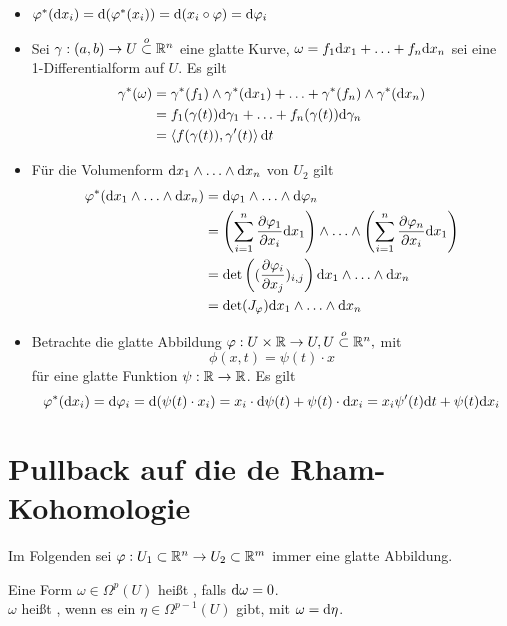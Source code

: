 \Bsp{}
\begin{itemize}
	\item $\varphi^*(\text{d} x_i) = \text{d}(\varphi^*(x_i)) = \text{d} (x_i \circ \varphi ) = \text{d} \varphi_i$
	\item Sei $\gamma : (a,b) \overset{}{\rightarrow} U \overset{o}{\subset} \mathbb{R}^n$ eine glatte Kurve, $\omega = f_1\text{d} x_1 + \ldots +f_n \text{d} x_n$ sei eine 1-Differentialform auf $U$. Es gilt
	\begin{align*}
	\gamma^*(\omega) &= \gamma^*(f_1) \wedge \gamma^*(\text{d} x_1) + \ldots + \gamma^*(f_n) \wedge \gamma^*(\text{d} x_n)\\
	&=f_1(\gamma(t)) \text{d} \gamma_1 + \ldots + f_n(\gamma(t)) \text{d} \gamma_n\\
	&= \left<f(\gamma(t)), \gamma'(t)\right> \text{d} t
	\end{align*}
	\item Für die Volumenform $\text{d} x_1 \wedge \ldots \wedge \text{d} x_n$ von $U_2$ gilt
	\begin{align*}
	\varphi^*(\text{d} x_1 \wedge \ldots \wedge \text{d} x_n) &= \text{d}\varphi_1 \wedge \ldots \wedge \text{d} \varphi_n\\
	&= \left(\sum_{i = 1}^n \frac{\partial \varphi_1}{\partial x_i}\text{d} x_1\right) \wedge \ldots \wedge\left(\sum_{i = 1}^n \frac{\partial \varphi_n}{\partial x_i}\text{d} x_1\right)\\
	&= \det\left( (\frac{\partial \varphi_i}{\partial x_j})_{i,j} \right) \text{d} x_1 \wedge \ldots \wedge \text{d} x_n\\
	&= \det( J_\varphi )\text{d} x_1 \wedge \ldots \wedge \text{d} x_n\\
	\end{align*}
	\item Betrachte die glatte Abbildung $\varphi : U \times \mathbb{R} \overset{}{\rightarrow} U, U \overset{o}{\subset} \mathbb{R}^n,$ mit
	\[ \phi(x,t) = \psi(t)\cdot x \] 
	für eine glatte Funktion $\psi : \mathbb{R} \overset{}{\rightarrow} \mathbb{R}$. Es gilt
	\[ \varphi^*(\text{d} x_i) = \text{d} \varphi_i = \text{d} (\psi(t) \cdot x_i) = x_i \cdot \text{d} \psi(t) + \psi(t) \cdot \text{d} x_i = x_i \psi'(t)\text{d} t + \psi(t) \text{d} x_i \]
\end{itemize}

\section{Pullback auf die de Rham-Kohomologie}
Im Folgenden sei $\varphi : U_1\subset \mathbb{R}^n\overset{}{\rightarrow} U_2\subset \mathbb{R}^m$ immer eine glatte Abbildung.

\Def{}
Eine Form $\omega \in \Omega^p(U)$ heißt , falls $\text{d} \omega = 0$.\\
$\omega$ heißt , wenn es ein $\eta \in \Omega^{p-1}(U)$ gibt, mit $\omega = \text{d} \eta$.


